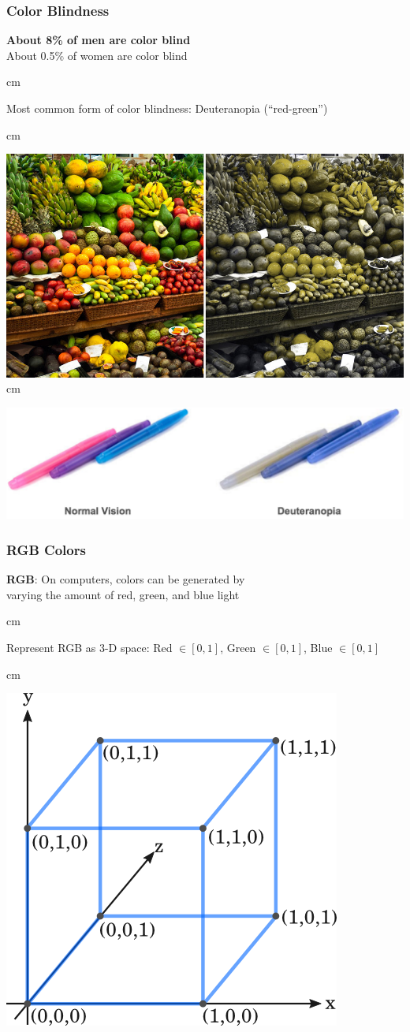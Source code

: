 \documentclass{beamer} %
\begin{document}
\begin{frame}\frametitle{Color Blindness}
	\centering
	
	\textbf{About 8\% of men are color blind}\\
	About 0.5\% of women are color blind
	
	 cm
	
	Most common form of color blindness:  Deuteranopia (``red-green'')
	
	 cm
	
	\includegraphics[width=0.66\linewidth]{redgreen}\\
	
	 cm
	
	\includegraphics[width=0.77\linewidth]{redgreen2}
	
\end{frame}



\begin{frame}\frametitle{RGB Colors}
	\small
	\centering
	
	\textbf{RGB}:  On computers, colors can be generated by \\varying the amount of red, green, and blue light
	
	
	 cm
	
	Represent RGB as 3-D space:  Red $\in [0,1]$, Green $\in [0,1]$, Blue $\in [0,1]$
	
	 cm
	
	\includegraphics[width=0.55\linewidth]{xyzcube}
	
\end{frame}
\end{document}
